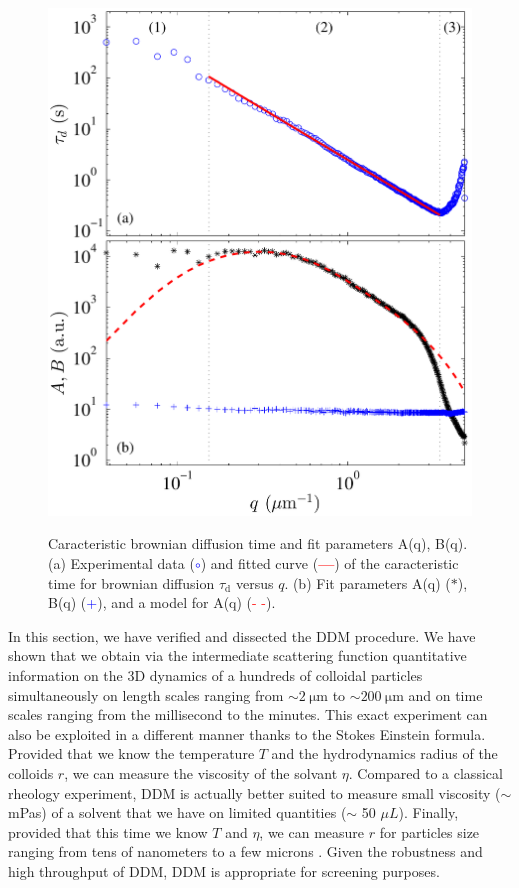\documentclass[%
 aip,
 jmp,%
 amsmath,amssymb,
reprint,%
]{revtex4-1}
\begin{document}
\begin{figure}
	\includegraphics[width=\linewidth]{DiffusionColloids.pdf}\\
	\caption{Caracteristic brownian diffusion time and fit parameters A(q), B(q).(a) Experimental data (\textcolor{blue}{$\circ$}) and fitted curve (\textcolor{red}{\textbf{---}}) of the caracteristic time for brownian diffusion $\tau_\text{d}$ versus $q$. (b) Fit parameters A(q) ($\ast$), B(q) (\textcolor{blue}{+}), and a model for A(q) (\textcolor{red}{- -}). }
	\label{FitDiffColl}
\end{figure}

In this section, we have verified and dissected the DDM procedure. We have shown that we obtain via the intermediate scattering function quantitative information on the 3D dynamics of a hundreds of colloidal particles simultaneously on length scales ranging from $\sim \SI{2}{\micro\meter}$ to $\sim \SI{200}{\micro\meter}$ and on time scales ranging from the millisecond to the minutes. This exact experiment can also be exploited in a different manner thanks to the Stokes Einstein formula. Provided  that we know the temperature $T$ and the hydrodynamics radius of the colloids $r$, we can measure the viscosity of the solvant $\eta$.  Compared to a classical rheology experiment, DDM is actually better suited to measure small viscosity ($\sim$ mPas) of a solvent that we have on limited quantities ($\sim$ 50 $\mu L$). Finally, provided that this time we know $T$ and $\eta$, we can measure $r$ for particles size ranging from tens of nanometers to a few microns \cite{2_DDM}. Given the robustness and high throughput of DDM, DDM is appropriate for screening purposes.
\end{document}
